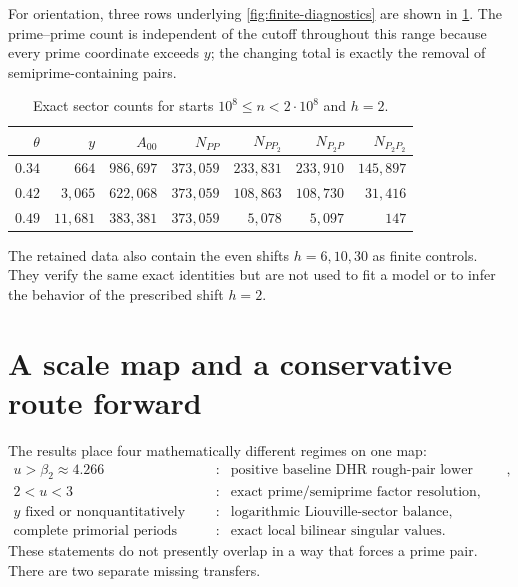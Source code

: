 \documentclass[11pt]{article}
\theoremstyle{definition}
\theoremstyle{remark}
\begin{document}
For orientation, three rows underlying \cref{fig:finite-diagnostics} are shown in \cref{tab:finite-sectors}.  The prime--prime count is independent of the cutoff throughout this range because every prime coordinate exceeds $y$; the changing total is exactly the removal of semiprime-containing pairs.

\begin{table}[htbp]
 \centering
 \caption{Exact sector counts for starts $10^8\le n<2\cdot10^8$ and $h=2$.}
 \label{tab:finite-sectors}
 \small
 \begin{tabular}{@{}rrrrrrr@{}}
  \toprule
  $\theta$ & $y$ & $A_{00}$ & $N_{PP}$ & $N_{P P_2}$ & $N_{P_2P}$ & $N_{P_2P_2}$\\
  \midrule
  $0.34$ & $664$   & $986{,}697$ & $373{,}059$ & $233{,}831$ & $233{,}910$ & $145{,}897$\\
  $0.42$ & $3{,}065$ & $622{,}068$ & $373{,}059$ & $108{,}863$ & $108{,}730$ & $31{,}416$\\
  $0.49$ & $11{,}681$ & $383{,}381$ & $373{,}059$ & $5{,}078$ & $5{,}097$ & $147$\\
  \bottomrule
 \end{tabular}
\end{table}

The retained data also contain the even shifts $h=6,10,30$ as finite controls.  They verify the same exact identities but are not used to fit a model or to infer the behavior of the prescribed shift $h=2$.

\section{A scale map and a conservative route forward}\label{sec:roadmap}

The results place four mathematically different regimes on one map:
\begin{equation}\label{eq:scale-map}
 \begin{array}{rcl}
 u>\beta_2\approx4.266
  &:& \text{positive baseline DHR rough-pair lower envelope},\\
 2<u<3
  &:& \text{exact prime/semiprime factor resolution},\\
 y\text{ fixed or nonquantitatively slow}
  &:& \text{logarithmic Liouville-sector balance},\\
 \text{complete primorial periods}
  &:& \text{exact local bilinear singular values}.
 \end{array}
\end{equation}
These statements do not presently overlap in a way that forces a prime pair.  There are two separate missing transfers.
\end{document}
